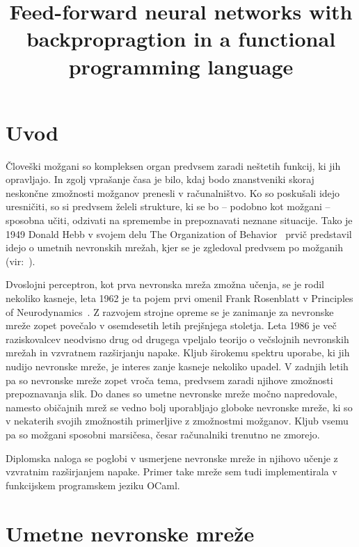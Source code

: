 \documentclass[mat1]{fmfdelo}
\title{Feed-forward neural networks with backpropragtion in a functional programming language}
\begin{document}
%
\section{Uvod}
%
Človeški možgani so kompleksen organ predvsem zaradi neštetih funkcij, ki jih opravljajo. In zgolj vprašanje časa je bilo, kdaj bodo znanstveniki skoraj neskončne zmožnosti možganov prenesli v računalništvo. Ko so poskušali idejo uresničiti, so si predvsem želeli strukture, ki se bo -- podobno kot možgani -- sposobna učiti, odzivati na spremembe in prepoznavati neznane situacije. Tako je 1949 Donald Hebb v svojem delu The Organization of Behavior~\cite{hebb} prvič predstavil idejo o umetnih nevronskih mrežah, kjer se je zgledoval predvsem po možganih (vir:~\cite{mreze1}). 

Dvoslojni perceptron, kot prva nevronska mreža zmožna učenja, se je rodil nekoliko kasneje, leta 1962 je ta pojem prvi omenil Frank Rosenblatt v Principles of Neurodynamics~\cite{rosenblatt}. Z razvojem strojne opreme se je zanimanje za nevronske mreže zopet povečalo v osemdesetih letih prejšnjega stoletja. Leta 1986 je več raziskovalcev neodvisno drug od drugega vpeljalo teorijo o večslojnih nevronskih mrežah in vzvratnem razširjanju napake. Kljub širokemu spektru uporabe, ki jih nudijo nevronske mreže, je interes zanje kasneje nekoliko upadel. V zadnjih letih pa so nevronske mreže zopet vroča tema, predvsem zaradi njihove zmožnosti prepoznavanja slik. Do danes so umetne nevronske mreže močno napredovale, namesto običajnih mrež se vedno bolj uporabljajo globoke nevronske mreže, ki so v nekaterih svojih zmožnostih primerljive z zmožnostmi možganov. Kljub vsemu pa so možgani sposobni marsičesa, česar računalniki trenutno ne zmorejo.

Diplomska naloga se poglobi v usmerjene nevronske mreže in njihovo učenje z vzvratnim razširjanjem napake. Primer take mreže sem tudi implementirala v funkcijskem programskem jeziku OCaml. 
%
\section{Umetne nevronske mreže}
%
%
\end{document}
